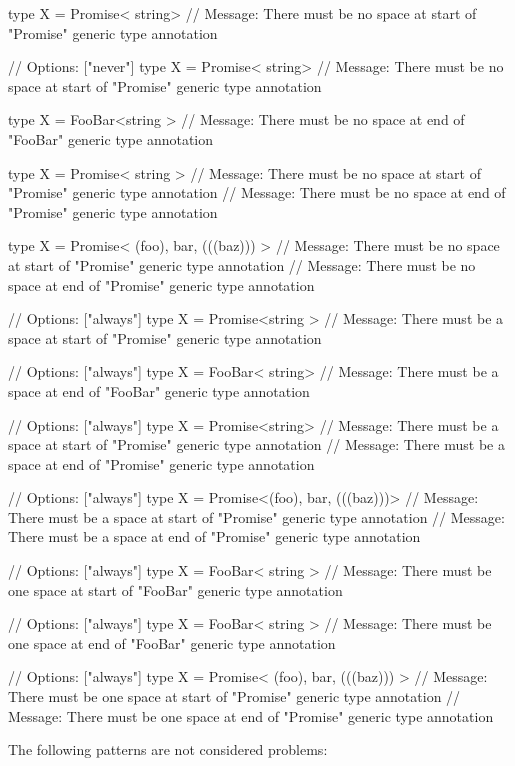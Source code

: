 \begin{DoxyCode}
type X = Promise< string>
// Message: There must be no space at start of "Promise" generic type annotation

// Options: ["never"]
type X = Promise<  string>
// Message: There must be no space at start of "Promise" generic type annotation

type X = FooBar<string >
// Message: There must be no space at end of "FooBar" generic type annotation

type X = Promise< string >
// Message: There must be no space at start of "Promise" generic type annotation
// Message: There must be no space at end of "Promise" generic type annotation

type X = Promise< (foo), bar, (((baz))) >
// Message: There must be no space at start of "Promise" generic type annotation
// Message: There must be no space at end of "Promise" generic type annotation

// Options: ["always"]
type X = Promise<string >
// Message: There must be a space at start of "Promise" generic type annotation

// Options: ["always"]
type X = FooBar< string>
// Message: There must be a space at end of "FooBar" generic type annotation

// Options: ["always"]
type X = Promise<string>
// Message: There must be a space at start of "Promise" generic type annotation
// Message: There must be a space at end of "Promise" generic type annotation

// Options: ["always"]
type X = Promise<(foo), bar, (((baz)))>
// Message: There must be a space at start of "Promise" generic type annotation
// Message: There must be a space at end of "Promise" generic type annotation

// Options: ["always"]
type X = FooBar<  string >
// Message: There must be one space at start of "FooBar" generic type annotation

// Options: ["always"]
type X = FooBar< string  >
// Message: There must be one space at end of "FooBar" generic type annotation

// Options: ["always"]
type X = Promise<  (foo), bar, (((baz)))  >
// Message: There must be one space at start of "Promise" generic type annotation
// Message: There must be one space at end of "Promise" generic type annotation
\end{DoxyCode}


The following patterns are not considered problems\+:


